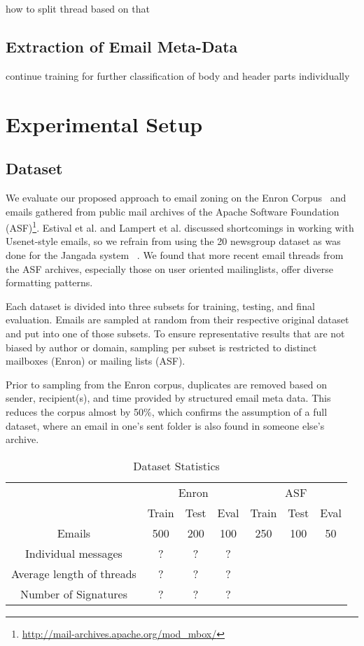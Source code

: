 \documentclass{llncs}
\begin{document}
how to split thread based on that

\subsection{Extraction of Email Meta-Data}
continue training for further classification of body and header parts individually

\section{Experimental Setup}

\subsection{Dataset}
We evaluate our proposed approach to email zoning on the Enron Corpus~\cite{enron} and emails gathered from public mail archives of the Apache Software Foundation (ASF)\footnote{\url{http://mail-archives.apache.org/mod\_mbox/}}. 
Estival et al. and Lampert et al. discussed shortcomings in working with Usenet-style emails, so we refrain from using the 20 newsgroup dataset as was done for the Jangada system ~\cite{profiling,zones,20news}.
We found that more recent email threads from the ASF archives, especially those on user oriented mailinglists, offer diverse formatting patterns.

Each dataset is divided into three subsets for training, testing, and final evaluation.
Emails are sampled at random from their respective original dataset and put into one of those subsets.
To ensure representative results that are not biased by author or domain, sampling per subset is restricted to distinct mailboxes (Enron) or mailing lists (ASF).

Prior to sampling from the Enron corpus, duplicates are removed based on sender, recipient(s), and time provided by structured email meta data.
This reduces the corpus almost by 50\%, which confirms the assumption of a full dataset, where an email in one's sent folder is also found in someone else's archive.

\begin{table}
	\centering
	\caption{Dataset Statistics}
	\label{tab:dataset}
	
	\begin{tabular}{ccccccc}
		\toprule
		& \multicolumn{3}{c}{Enron} &  \multicolumn{3}{c}{ASF} \\
		\cmidrule(lr){2-4}
		\cmidrule(lr){5-7}
		& Train    & Test   & Eval   & Train   & Test   & Eval  \\
		\midrule
		Emails                    & 500      & 200    & 100    &   250   &  100   &   50  \\
		Individual messages       & ?        & ?      & ?      &         &        &       \\
		Average length of threads & ?        & ?      & ?      &         &        &       \\
		Number of Signatures      & ?        & ?      & ?      &         &        &       \\
		\bottomrule
	\end{tabular}
\end{table}
\end{document}
